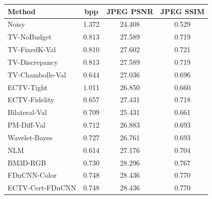 \begin{tabular}{lccc}
\toprule
Method & bpp & JPEG PSNR & JPEG SSIM \\
\midrule
Noisy & 1.372 & 24.408 & 0.529 \\
TV-NoBudget & 0.813 & 27.589 & 0.719 \\
TV-FixedK-Val & 0.810 & 27.602 & 0.721 \\
TV-Discrepancy & 0.813 & 27.589 & 0.719 \\
TV-Chambolle-Val & 0.644 & 27.036 & 0.696 \\
ECTV-Tight & 1.011 & 26.850 & 0.660 \\
ECTV-Fidelity & 0.657 & 27.431 & 0.718 \\
Bilateral-Val & 0.709 & 25.431 & 0.661 \\
PM-Diff-Val & 0.712 & 26.883 & 0.693 \\
Wavelet-Bayes & 0.727 & 26.761 & 0.693 \\
NLM & 0.614 & 27.176 & 0.704 \\
BM3D-RGB & 0.730 & 28.296 & 0.767 \\
FDnCNN-Color & 0.748 & 28.436 & 0.770 \\
ECTV-Cert-FDnCNN & 0.748 & 28.436 & 0.770 \\
\bottomrule
\end{tabular}
